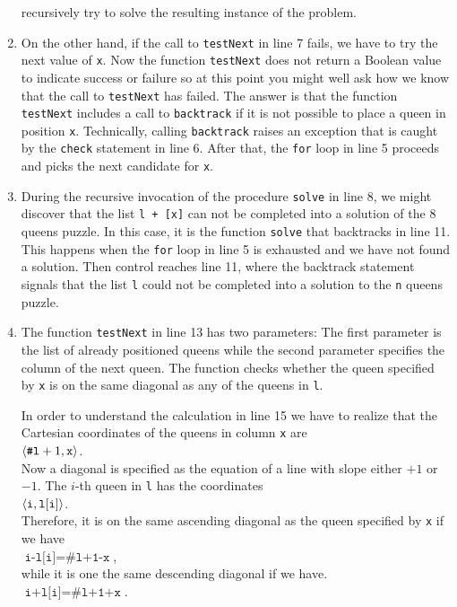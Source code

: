 \begin{enumerate}
      recursively try to solve the resulting instance of the problem.
\item On the other hand, if the call to \texttt{testNext} in line 7 fails, we have to try
      the next value of \texttt{x}.  Now the function \texttt{testNext} does not return a 
      Boolean value to indicate success or failure so at this point you might well
      ask how we know that the call to \texttt{testNext} has failed.  The answer is that the function
      \texttt{testNext} includes a call to \texttt{backtrack} if it is not possible to
      place a queen in position \texttt{x}.  Technically, calling \texttt{backtrack}
      raises an exception that is caught by the \texttt{check} statement in line 6.
      After that,  the \texttt{for} loop in line 5 proceeds and picks the next
      candidate for \texttt{x}.
\item During the recursive invocation of the procedure \texttt{solve} in line 8, we might
      discover that the list \texttt{l + [x]} can not be completed into a solution of the 8
      queens puzzle.   In this case, it is the function \texttt{solve} that backtracks
      in line 11.  This happens when the \texttt{for} loop in line 5 is exhausted and we
      have not found a solution.  Then
      control  reaches line 11, where the backtrack statement  signals that the list \texttt{l}
      could not be completed into a solution to the \texttt{n} queens puzzle.
\item The function \texttt{testNext} in line 13 has two parameters:  The first parameter is the list
      of already positioned queens while the second parameter specifies the column of the next
      queen.  The function checks whether the queen specified by \texttt{x} is on the same
      diagonal as any of the queens in \texttt{l}.
      
      In order to understand the calculation in line 15 we have to realize that the
      Cartesian coordinates of the queens in column \texttt{x} are 
      \\[0.2cm]
      \hspace*{1.3cm}
      $\pair(\texttt{\#l}+1, \mathtt{x})$.
      \\[0.2cm]
      Now a diagonal is specified as the equation of a line with slope either $+1$ or $-1$.
      The $i$-th  queen in \texttt{l} has the coordinates
      \\[0.2cm]
      \hspace*{1.3cm}
      $\pair(\texttt{i}, \mathtt{l[i]})$.      
      \\[0.2cm]
      Therefore, it is on the same ascending diagonal as the queen specified by \texttt{x} if
      we have
      \\[0.2cm]
      \hspace*{1.3cm}
      $\texttt{i-l[i]} = \texttt{\#l+1-x}$,
      \\[0.2cm]
      while it is one the same descending diagonal if we have.
      \\[0.2cm]
      \hspace*{1.3cm}
      $\texttt{i+l[i]} = \texttt{\#l+1+x}$.
\end{enumerate}

